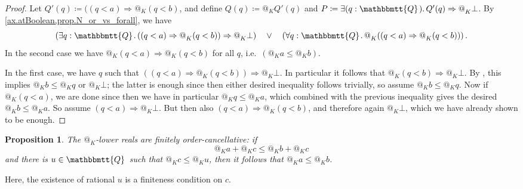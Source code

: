 \documentclass[11pt, oneside, article]{memoir}
\makeatletter
\theoremstyle{plain}
\newtheorem{proposition}[theorem]{Proposition}
\theoremstyle{definition}
\theoremstyle{remark}
\newcommand{\internal}[1]{\raisebox{-.03ex}{$\mathbbmtt{#1}$}}
\newcommand{\hs}{\hspace{1.1pt}}
\newcommand{\tQQ}{\internal{Q}\hs}
\newcommand{\AtSymbol}{{@}}
\newcommand{\At}[2][]{\AtSymbol^{#1}_{#2}}
\newcommand{\imp}{\Rightarrow}
\makeatother
\begin{document}
\begin{proof}
	Let $Q'(q)\coloneqq((q<a)\imp\At{K}(q<b)$, and define $Q(q)\coloneqq\At{K}Q'(q)$ and $P\coloneqq\exists(q:\tQQ)\ldotp Q'(q)\imp\At{K}\bot$. By \cref{ax.atBoolean,prop.N_or_vs_forall}, we have 
	\[
		\left( \exists q : \tQQ \ldotp ((q < a) \imp \At{K} (q < b)) \imp \At{K} \bot \right) \quad \lor \quad \left( \forall q : \tQQ \ldotp \At{K} ((q < a) \imp \At{K} (q < b)) \right).
	\]
	In the second case we have $\At{K}(q<a)\imp\At{K}(q<b)$ for all $q$, i.e.\ $(\At{K}a \leq \At{K}b)$.
	
	In the first case, we have $q$ such that $((q < a) \imp \At{K} (q < b)) \imp \At{K} \bot$. In particular it follows that $\At{K}(q < b) \imp \At{K} \bot$. By , this implies $\At{K} b \leq \At{K} q$ or $\At{K} \bot$; the latter is enough since then either desired inequality follows trivially, so assume $\At{K} b \leq \At{K} q$. Now if $\At{K}(q < a)$, we are done since then we have in particular $\At{K} q \leq \At{K} a$, which combined with the previous inequality gives the desired $\At{K} b \leq \At{K} a$. So assume $(q < a) \imp \At{K} \bot$. But then also $(q < a) \imp \At{K} (q < b)$, and therefore again $\At{K} \bot$, which we have already shown to be enough.
\end{proof}

\begin{proposition}
	\label{prop.at_order_canc}
	The $\At{K}$-lower reals are finitely order-cancellative: if
	\[
		\At{K} a + \At{K} c \leq \At{K} b + \At{K} c
	\]
	and there is $u \in \tQQ$ such that $\At{K} c \leq \At{K} u$, then it follows that $\At{K} a \leq \At{K} b$.
\end{proposition}

Here, the existence of rational $u$ is a finiteness condition on $c$.
\end{document}
